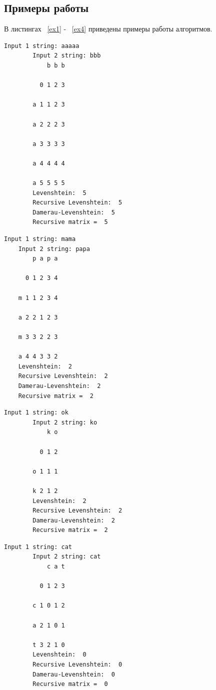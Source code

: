 \documentclass[a4paper]{article}
\begin{document}
	\subsection{Примеры работы}
	В листингах ~\ref{ex1} - ~\ref{ex4} приведены примеры работы алгоритмов.
	\begin{lstlisting}[label = ex1, caption = Пример работы алгоритмов]
		Input 1 string: aaaaa
		Input 2 string: bbb
		    b b b 
		
		  0 1 2 3 
		
		a 1 1 2 3 
		
		a 2 2 2 3 
		
		a 3 3 3 3 
		
		a 4 4 4 4 
		
		a 5 5 5 5 
		Levenshtein:  5
		Recursive Levenshtein:  5
		Damerau-Levenshtein:  5
		Recursive matrix =  5
	\end{lstlisting}
	\begin{lstlisting}[label = ex2, caption = Пример работы алгоритмов]
	Input 1 string: mama
	Input 2 string: papa
	    p a p a 
	
	  0 1 2 3 4 
	
	m 1 1 2 3 4 
	
	a 2 2 1 2 3 
	
	m 3 3 2 2 3 
	
	a 4 4 3 3 2 
	Levenshtein:  2
	Recursive Levenshtein:  2
	Damerau-Levenshtein:  2
	Recursive matrix =  2
	\end{lstlisting}
	\clearpage
	\begin{lstlisting}[label = ex3, caption = Пример работы алгоритмов]
		Input 1 string: ok
		Input 2 string: ko
		    k o 
		
		  0 1 2 
		
		o 1 1 1 
		
		k 2 1 2 
		Levenshtein:  2
		Recursive Levenshtein:  2
		Damerau-Levenshtein:  2
		Recursive matrix =  2
	\end{lstlisting}
	\begin{lstlisting}[label = ex4, caption = Пример работы алгоритмов]
		Input 1 string: cat
		Input 2 string: cat
		    c a t 
		
		  0 1 2 3 
		
		c 1 0 1 2 
		
		a 2 1 0 1 
		
		t 3 2 1 0
		Levenshtein:  0
		Recursive Levenshtein:  0
		Damerau-Levenshtein:  0
		Recursive matrix =  0
	\end{lstlisting}
	\clearpage
	
\end{document}
